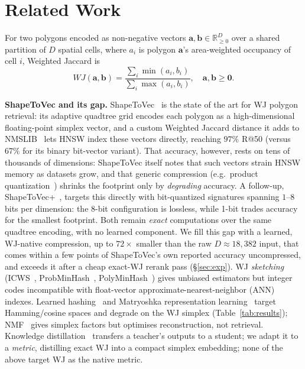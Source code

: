 \documentclass[sigconf]{acmart}
\begin{document}
\section{Related Work}
\label{sec:related}
For two polygons encoded as non-negative vectors $\mathbf{a},\mathbf{b}\in\mathbb{R}^D_{\ge0}$
over a shared partition of $D$ spatial cells, where $a_i$ is polygon $\mathbf{a}$'s
area-weighted occupancy of cell $i$, Weighted Jaccard is
\begin{equation}
  WJ(\mathbf{a},\mathbf{b}) = \frac{\sum_i \min(a_i,b_i)}{\sum_i \max(a_i,b_i)},
  \quad \mathbf{a},\mathbf{b} \ge \mathbf{0}.
  \label{eq:wj}
\end{equation}

\textbf{ShapeToVec and its gap.} ShapeToVec~\cite{shape2vec} is the state of the art
for WJ polygon retrieval: its adaptive quadtree grid encodes each polygon as a
high-dimensional floating-point simplex vector, and a custom Weighted Jaccard
distance it adds to NMSLIB~\cite{boytsov13} lets HNSW index these vectors directly,
reaching $97\%$ R@50 (versus $67\%$ for its binary bit-vector variant). That accuracy,
however, rests on tens of thousands of dimensions: ShapeToVec itself notes that such
vectors strain HNSW memory as datasets grow, and that generic compression
(e.g.\ product quantization~\cite{jegou10pq}) shrinks the footprint only by
\emph{degrading} accuracy. A follow-up, ShapeToVec+~\cite{shapetovecplus26}, targets
this directly with bit-quantized signatures spanning $1$--$8$ bits per dimension: the
8-bit configuration is lossless, while 1-bit trades accuracy for the smallest
footprint. Both remain \emph{exact} computations over the same quadtree encoding, with
no learned component.
We fill this gap with a learned, WJ-native compression, up to $72\times$ smaller than
the raw $D{\approx}18{,}382$ input, that comes within a few points of ShapeToVec's own
reported accuracy uncompressed, and exceeds it after a cheap exact-WJ rerank pass
(\S\ref{sec:exp}).
WJ \emph{sketching} (ICWS~\cite{ioffe10}, ProbMinHash~\cite{probminhash20},
PolyMinHash~\cite{polyminhash25}) gives unbiased estimators but integer codes
incompatible with float-vector approximate-nearest-neighbor (ANN) indexes. Learned
hashing~\cite{hashsurvey14,deephashsurvey22} and Matryoshka representation
learning~\cite{matryoshka22} target Hamming/cosine spaces and degrade on the WJ
simplex (Table~\ref{tab:results}); NMF~\cite{nmf99} gives simplex factors but
optimises reconstruction, not retrieval. Knowledge distillation~\cite{hinton15}
transfers a teacher's outputs to a student; we adapt it to a \emph{metric},
distilling exact WJ into a compact simplex embedding; none of the above target
WJ as the native metric.
\end{document}
